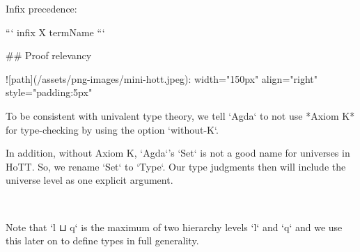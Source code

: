 Infix precedence:

```
infix X termName
```

## Proof relevancy

![path](/assets/png-images/mini-hott.jpeg){: width="150px" align="right" style="padding:5px"}

To be consistent with univalent type theory, we tell `Agda` to not use *Axiom K*
for type-checking by using the option `without-K`.

\begin{code}%
\>[0]\AgdaSymbol{\{-\#}\AgdaSpace{}%
\AgdaSpace{}%
\AgdaSpace{}%
\AgdaSymbol{\#-\}}\<%
\end{code}

In addition, without Axiom K, `Agda`'s `Set` is not a good name for universes in HoTT. So, we
rename `Set` to `Type`. Our type judgments then will include the universe level
as one explicit argument.

\begin{code}%
\>[0]\AgdaSpace{}%
\AgdaSpace{}%
\<%
\\
\>[0][@{}l@{\AgdaIndent{0}}]%
\>[2]\AgdaSpace{}%
\AgdaSymbol{(}\AgdaSpace{}%
\AgdaSpace{}%
\AgdaSymbol{;}\AgdaSpace{}%
\AgdaSymbol{;}\AgdaSpace{}%
\AgdaSymbol{;}\AgdaSpace{}%
\AgdaSpace{}%
\AgdaSymbol{)}\AgdaSpace{}%
\<%
\end{code}

Note that `l ⊔ q` is the maximum of two hierarchy levels `l` and `q` and we
use this later on to define types in full generality.

\begin{code}%
\>[0]\<%
\\
\>[0][@{}l@{\AgdaIndent{0}}]%
\>[2]\AgdaSymbol{:}\AgdaSpace{}%
\AgdaSymbol{(}\AgdaSpace{}%
\AgdaSymbol{:}\AgdaSpace{}%
\AgdaSymbol{)}\<%
\\
%
\>[2]\AgdaSpace{}%
\AgdaSpace{}%
\AgdaSymbol{(}\AgdaSpace{}%
\AgdaSymbol{)}\<%
\\
%
\\[\AgdaEmptyExtraSkip]%
\>[0]\AgdaSpace{}%
\AgdaSpace{}%
\AgdaSymbol{=}\AgdaSpace{}%
\AgdaSpace{}%
\<%
\end{code}

